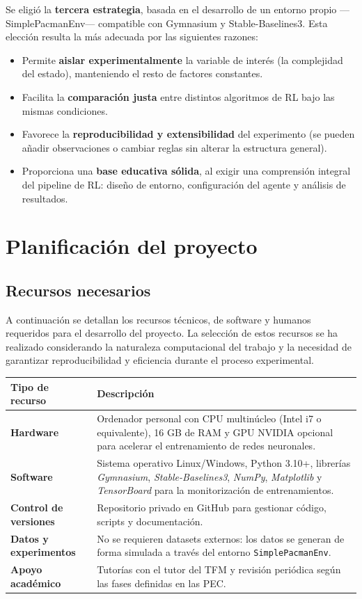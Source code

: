 \documentclass[12pt,a4paper,twoside,openany]{book}
\begin{document}
Se eligió la \textbf{tercera estrategia}, basada en el desarrollo de un entorno propio —SimplePacmanEnv— compatible con Gymnasium y Stable-Baselines3.
Esta elección resulta la más adecuada por las siguientes razones:

\begin{itemize}
	\item Permite \textbf{aislar experimentalmente} la variable de interés (la complejidad del estado), manteniendo el resto de factores constantes.
	\item Facilita la \textbf{comparación justa} entre distintos algoritmos de RL bajo las mismas condiciones.
	\item Favorece la \textbf{reproducibilidad y extensibilidad} del experimento (se pueden añadir observaciones o cambiar reglas sin alterar la estructura general).
	\item Proporciona una \textbf{base educativa sólida}, al exigir una comprensión integral del pipeline de RL: diseño de entorno, configuración del agente y análisis de resultados.
\end{itemize}

\section{Planificación del proyecto}

\subsection{Recursos necesarios}

A continuación se detallan los recursos técnicos, de software y humanos requeridos para el desarrollo del proyecto. La selección de estos recursos se ha realizado considerando la naturaleza computacional del trabajo y la necesidad de garantizar reproducibilidad y eficiencia durante el proceso experimental.

\begin{longtable}{>{\bfseries}p{3.5cm} p{10cm}}
Tipo de recurso & Descripción \\ \hline
Hardware & Ordenador personal con CPU multinúcleo (Intel i7 o equivalente), 16 GB de RAM y GPU NVIDIA opcional para acelerar el entrenamiento de redes neuronales. \\
Software & Sistema operativo Linux/Windows, Python 3.10+, librerías \textit{Gymnasium}, \textit{Stable-Baselines3}, \textit{NumPy}, \textit{Matplotlib} y \textit{TensorBoard} para la monitorización de entrenamientos. \\
Control de versiones & Repositorio privado en GitHub para gestionar código, scripts y documentación. \\
Datos y experimentos & No se requieren datasets externos: los datos se generan de forma simulada a través del entorno \texttt{SimplePacmanEnv}. \\
Apoyo académico & Tutorías con el tutor del TFM y revisión periódica según las fases definidas en las PEC. \\
\end{longtable}
\end{document}
